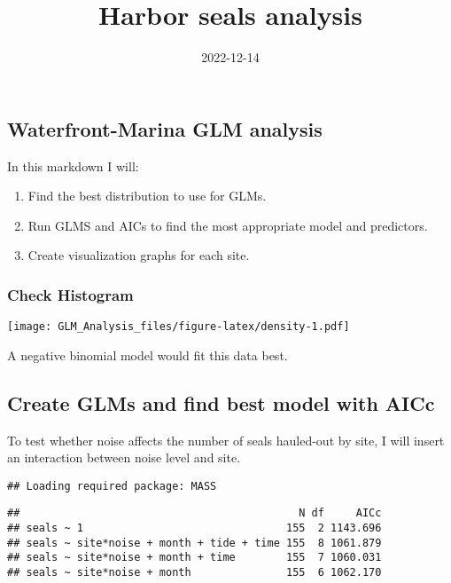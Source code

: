 \documentclass[
]{article}
\title{Harbor seals analysis}
\author{}
\date{\vspace{-2.5em}2022-12-14}
\begin{document}
\maketitle

\hypertarget{waterfront-marina-glm-analysis}{%
\subsection{Waterfront-Marina GLM
analysis}\label{waterfront-marina-glm-analysis}}

In this markdown I will:

\begin{enumerate}
\def\labelenumi{\arabic{enumi}.}
\item
  Find the best distribution to use for GLMs.
\item
  Run GLMS and AICs to find the most appropriate model and predictors.
\item
  Create visualization graphs for each site.
\end{enumerate}

\hypertarget{check-histogram}{%
\subsubsection{Check Histogram}\label{check-histogram}}

\texttt{[image: GLM\_Analysis\_files/figure-latex/density-1.pdf]}

A negative binomial model would fit this data best.

\hypertarget{create-glms-and-find-best-model-with-aicc}{%
\subsection{Create GLMs and find best model with
AICc}\label{create-glms-and-find-best-model-with-aicc}}

To test whether noise affects the number of seals hauled-out by site, I
will insert an interaction between noise level and site.

\begin{verbatim}
## Loading required package: MASS
\end{verbatim}

\begin{verbatim}
##                                            N df     AICc
## seals ~ 1                                155  2 1143.696
## seals ~ site*noise + month + tide + time 155  8 1061.879
## seals ~ site*noise + month + time        155  7 1060.031
## seals ~ site*noise + month               155  6 1062.170
\end{verbatim}
\end{document}
